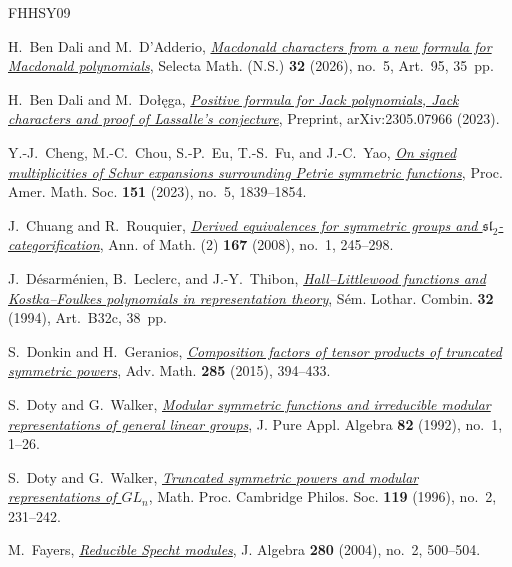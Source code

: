 \documentclass[12pt,reqno,a4paper]{amsart}
\numberwithin{equation}{section}
\numberwithin{figure}{section}
\theoremstyle{plain}
\theoremstyle{definition}
\begin{document}
\begin{thebibliography}{FHHSY09}\frenchspacing\hypersetup{urlcolor=black}

H.~Ben Dali and M.~D'Adderio,
\emph{\href{https://doi.org/10.1007/s00029-026-01201-6}{Macdonald characters from a new formula for Macdonald polynomials}},
Selecta Math. (N.S.) \textbf{32} (2026), no.~5, Art.~95, 35~pp.

H.~Ben Dali and M.~{\selectfont Do{\l}\k{e}ga},
\emph{\href{https://arxiv.org/abs/2305.07966}{Positive formula for Jack polynomials, Jack characters and proof of
Lassalle's conjecture}},
Preprint, arXiv:2305.07966 (2023).

Y.-J.~Cheng, M.-C.~Chou, S.-P.~Eu, T.-S.~Fu, and J.-C.~Yao,
\emph{\href{https://doi.org/10.1090/proc/16263}{On signed multiplicities of Schur expansions surrounding Petrie
symmetric functions}},
Proc. Amer. Math. Soc. \textbf{151} (2023), no.~5, 1839--1854.

J.~Chuang and R.~Rouquier,
\emph{\href{https://doi.org/10.4007/annals.2008.167.245}{Derived equivalences for symmetric groups and
$\mathfrak{sl}_2$-categorification}},
Ann. of Math. (2) \textbf{167} (2008), no.~1, 245--298.

J.~D\'esarm\'enien, B.~Leclerc, and J.-Y.~Thibon,
\emph{\href{https://www.mat.univie.ac.at/~slc/opapers/s32leclerc.html}{Hall--Littlewood functions and Kostka--Foulkes polynomials in
representation theory}},
S\'em. Lothar. Combin. \textbf{32} (1994), Art.~B32c, 38~pp.

S.~Donkin and H.~Geranios,
\emph{\href{https://doi.org/10.1016/j.aim.2015.07.026}{Composition factors of tensor products of truncated symmetric powers}},
Adv. Math. \textbf{285} (2015), 394--433.

S.~Doty and G.~Walker,
\emph{\href{https://doi.org/10.1016/0022-4049(92)90007-3}{Modular symmetric functions and irreducible modular representations
of general linear groups}},
J. Pure Appl. Algebra \textbf{82} (1992), no.~1, 1--26.

S.~Doty and G.~Walker,
\emph{\href{https://doi.org/10.1017/S0305004100074120}{Truncated symmetric powers and modular representations of $GL_n$}},
Math. Proc. Cambridge Philos. Soc. \textbf{119} (1996), no.~2, 231--242.

M.~Fayers,
\emph{\href{https://doi.org/10.1016/j.jalgebra.2003.09.053}{Reducible Specht modules}},
J. Algebra \textbf{280} (2004), no.~2, 500--504.


\end{thebibliography}
\end{document}
